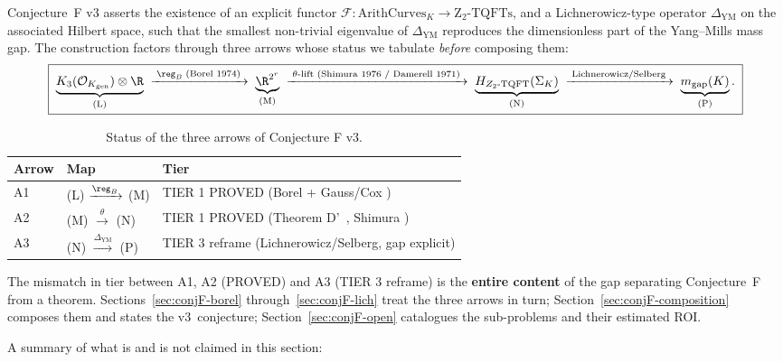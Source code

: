 Conjecture~F v3 asserts the existence of an explicit functor
$\mathcal{F}: \mathrm{ArithCurves}_K \to \mathrm{Z_2\text{-}TQFTs}$,
and a Lichnerowicz-type operator $\Delta_{\mathrm{YM}}$ on the
associated Hilbert space, such that the smallest non-trivial
eigenvalue of $\Delta_{\mathrm{YM}}$ reproduces the dimensionless part
of the Yang--Mills mass gap.  The construction factors through three
arrows whose status we tabulate \emph{before} composing them:
\[
\boxed{\;
\underbrace{K_3(\mathcal{O}_{K_{\mathrm{gen}}}) \otimes \R}_{\text{(L)}}
\;\xrightarrow{\;\reg_B\;\text{(Borel 1974)}\;}\;
\underbrace{\R^{2^{r}}}_{\text{(M)}}
\;\xrightarrow{\;\theta\text{-lift (Shimura 1976 / Damerell 1971)}\;}\;
\underbrace{H_{Z_2\text{-TQFT}}(\Sigma_K)}_{\text{(N)}}
\;\xrightarrow{\;\text{Lichnerowicz/Selberg}\;}\;
\underbrace{m_{\mathrm{gap}}(K)}_{\text{(P)}}.
\;}
\]
\begin{table}[h!]
\caption{Status of the three arrows of Conjecture F v3.}
\label{tab:conjF-arrows}
\centering
\begin{tabular}{lll}
\toprule
Arrow & Map & Tier \\
\midrule
A1 & (L) $\xrightarrow{\reg_B}$ (M) & TIER 1 PROVED (Borel \cite{Borel1974} + Gauss/Cox \cite{Cox1989}) \\
A2 & (M) $\xrightarrow{\theta}$ (N) & TIER 1 PROVED (Theorem D'~\cite{ThmDPrime2026}, Shimura \cite{Shimura1971}) \\
A3 & (N) $\xrightarrow{\Delta_{\mathrm{YM}}}$ (P) & TIER 3 reframe (Lichnerowicz/Selberg, gap explicit) \\
\bottomrule
\end{tabular}
\end{table}

\noindent The mismatch in tier between A1, A2 (PROVED) and A3 (TIER 3
reframe) is the {\bf entire content} of the gap separating
Conjecture~F from a theorem.  Sections~\ref{sec:conjF-borel}
through~\ref{sec:conjF-lich} treat the three arrows in turn;
Section~\ref{sec:conjF-composition} composes them and states the
v3~conjecture; Section~\ref{sec:conjF-open} catalogues the
sub-problems and their estimated ROI.

\medskip
A summary of what is and is not claimed in this section:

